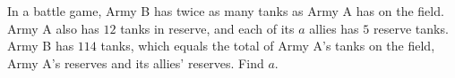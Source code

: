 In a battle game, Army B has twice as many tanks as Army A has on the field. Army A also has $12$ tanks in reserve, and each of its $a$ allies has $5$ reserve tanks. Army B has $114$ tanks, which equals the total of Army A's tanks on the field, Army A's reserves and its allies' reserves. Find $a$.
